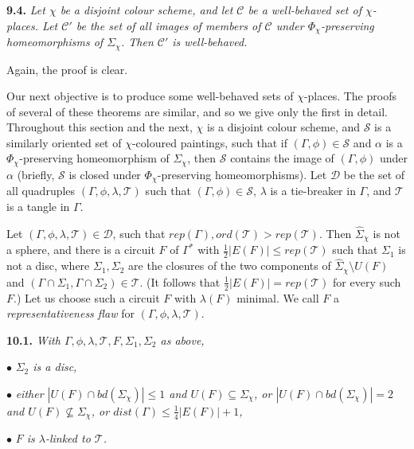 \textbf{9.4.} \textit{Let $\chi$ be a disjoint colour scheme, and let $\mathscr{C}$ be a well-behaved set of $\chi$-places. Let $\mathscr{C}'$ be the set of all images of members of $\mathscr{C}$ under $\Phi_\chi$-preserving homeomorphisms of $\Sigma_\chi$. Then $\mathscr{C}'$ is well-behaved.}

Again, the proof is clear.


Our next objective is to produce some well-behaved sets of $\chi$-places. The proofs of several of these theorems are similar, and so we give only the first in detail. Throughout this section and the next, $\chi$ is a disjoint colour scheme, and $\mathscr{S}$ is a similarly oriented set of $\chi$-coloured paintings, such that if $(\Gamma, \phi) \in \mathscr{S}$ and $\alpha$ is a $\Phi_\chi$-preserving homeomorphism of $\Sigma_\chi$, then $\mathscr{S}$ contains the image of $(\Gamma, \phi)$ under $\alpha$ (briefly, $\mathscr{S}$ is closed under $\Phi_\chi$-preserving homeomorphisms). Let $\mathscr{D}$ be the set of all quadruples $(\Gamma, \phi, \lambda, \mathscr{T})$ such that $(\Gamma, \phi) \in \mathscr{S}$, $\lambda$ is a tie-breaker in $\Gamma$, and $\mathscr{T}$ is a tangle in $\Gamma$.

Let $(\Gamma, \phi, \lambda, \mathscr{T}) \in \mathscr{D}$, such that $rep(\Gamma), ord(\mathscr{T}) > rep(\mathscr{T})$. Then $\hat{\Sigma}_\chi$ is not a sphere, and there is a circuit $F$ of $\Gamma^*$ with $\frac{1}{2}|E(F)| \le rep(\mathscr{T})$ such that $\Sigma_1$ is not a disc, where $\Sigma_1, \Sigma_2$ are the closures of the two components of $\hat{\Sigma}_\chi \setminus U(F)$ and $(\Gamma \cap \Sigma_1, \Gamma \cap \Sigma_2) \in \mathscr{T}$. (It follows that $\frac{1}{2}|E(F)| = rep(\mathscr{T})$ for every such $F$.) Let us choose such a circuit $F$ with $\lambda(F)$ minimal. We call $F$ a \textit{representativeness flaw} for $(\Gamma, \phi, \lambda, \mathscr{T})$.

\textbf{10.1.} \textit{With $\Gamma, \phi, \lambda, \mathscr{T}, F, \Sigma_1, \Sigma_2$ as above,}

\hspace*{12pt}$\bullet$ \textit{$\Sigma_2$ is a disc,}

\hspace*{12pt}$\bullet$ \textit{either $|U(F) \cap bd(\Sigma_\chi)| \le 1$ and $U(F) \subseteq \Sigma_\chi$, or $|U(F) \cap bd(\Sigma_\chi)| = 2$ and $U(F) \not\subseteq \Sigma_\chi$, or $dist(\Gamma) \le \frac{1}{4}|E(F)| + 1$,}

\hspace*{12pt}$\bullet$ \textit{$F$ is $\lambda$-linked to $\mathscr{T}$.}
